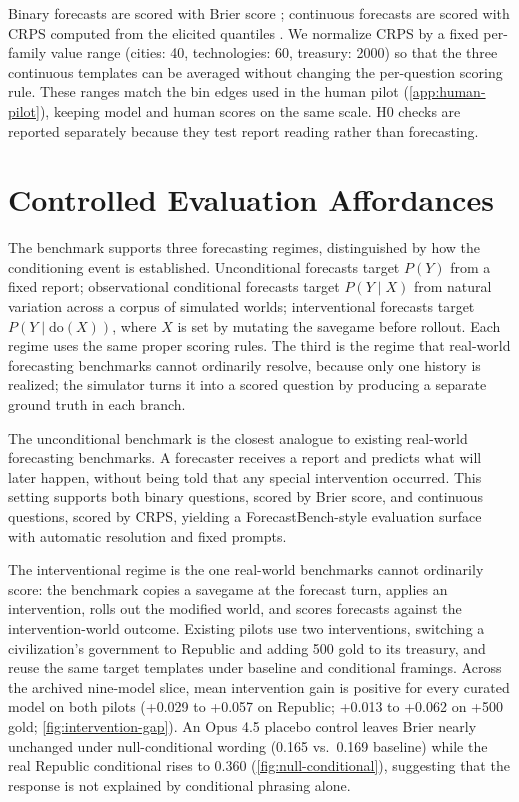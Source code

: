 \documentclass{article}
\begin{document}
Binary forecasts are scored with Brier score \citep{brier1950verification}; continuous forecasts are scored with CRPS computed from the elicited quantiles \citep{gneiting2007proper}. We normalize CRPS by a fixed per-family value range (cities: 40, technologies: 60, treasury: 2000) so that the three continuous templates can be averaged without changing the per-question scoring rule. These ranges match the bin edges used in the human pilot (\cref{app:human-pilot}), keeping model and human scores on the same scale. H0 checks are reported separately because they test report reading rather than forecasting.

\section{Controlled Evaluation Affordances}

The benchmark supports three forecasting regimes, distinguished by how the conditioning event is established. Unconditional forecasts target $P(Y)$ from a fixed report; observational conditional forecasts target $P(Y \mid X)$ from natural variation across a corpus of simulated worlds; interventional forecasts target $P(Y \mid \mathrm{do}(X))$, where $X$ is set by mutating the savegame before rollout. Each regime uses the same proper scoring rules. The third is the regime that real-world forecasting benchmarks cannot ordinarily resolve, because only one history is realized; the simulator turns it into a scored question by producing a separate ground truth in each branch.

The unconditional benchmark is the closest analogue to existing real-world forecasting benchmarks. A forecaster receives a report and predicts what will later happen, without being told that any special intervention occurred. This setting supports both binary questions, scored by Brier score, and continuous questions, scored by CRPS, yielding a ForecastBench-style evaluation surface with automatic resolution and fixed prompts.

The interventional regime is the one real-world benchmarks cannot ordinarily score: the benchmark copies a savegame at the forecast turn, applies an intervention, rolls out the modified world, and scores forecasts against the intervention-world outcome. Existing pilots use two interventions, switching a civilization's government to Republic and adding 500 gold to its treasury, and reuse the same target templates under baseline and conditional framings. Across the archived nine-model slice, mean intervention gain is positive for every curated model on both pilots (+0.029 to +0.057 on Republic; +0.013 to +0.062 on +500 gold; \cref{fig:intervention-gap}). An Opus 4.5 placebo control leaves Brier nearly unchanged under null-conditional wording (0.165 vs.\ 0.169 baseline) while the real Republic conditional rises to 0.360 (\cref{fig:null-conditional}), suggesting that the response is not explained by conditional phrasing alone.
\end{document}
